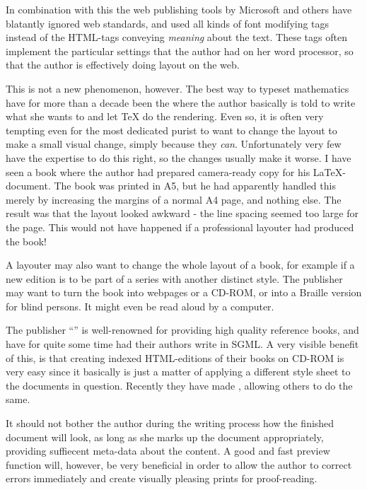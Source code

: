 In combination with this the web publishing tools by Microsoft and
others have blatantly ignored web standards, and used all kinds of
font modifying tags instead of the HTML-tags conveying \textit{meaning}
about the text.  These tags often implement the particular settings
that the author had on her word processor, so that the author is
effectively doing layout on the web.

This is not a new phenomenon, however.  The best way to typeset
mathematics have for more than a decade been the
 where the author basically is
told to write what she wants to and let {\TeX} do the rendering.  Even
so, it is often very tempting even for the most dedicated purist to
want to change the layout to make a small visual change, simply
because they \textit{can}.  Unfortunately very few have the expertise
to do this right, so the changes usually make it worse.  I have seen a
book where the author had prepared camera-ready copy for his
{\LaTeX}-document.  The book was printed in A5, but he had apparently
handled this merely by increasing the margins of a normal A4 page, and
nothing else.  The result was that the layout looked awkward - the
line spacing seemed too large for the page.  This would not have
happened if a professional layouter had produced the book!

A layouter may also want to change the whole layout of a book, for
example if a new edition is to be part of a series with another
distinct style.  The publisher may want to turn the book into webpages
or a CD-ROM, or into a Braille version for blind persons.  It might
even be read aloud by a computer.

  The publisher ``'' is well-renowned for providing high quality reference
books, and have for quite some time had their authors write in SGML.
A very visible benefit of this, is that creating indexed HTML-editions
of their books on CD-ROM is very easy since it basically is just a
matter of applying a different style sheet to the documents in
question.  Recently they have made
, allowing others
to do the same.

It should not bother the author during the writing process how the
finished document will look, as long as she marks up the document
appropriately, providing suffiecent meta-data about the content.  A
good and fast preview function will, however, be very beneficial in
order to allow the author to correct errors immediately and create
visually pleasing prints for proof-reading.

